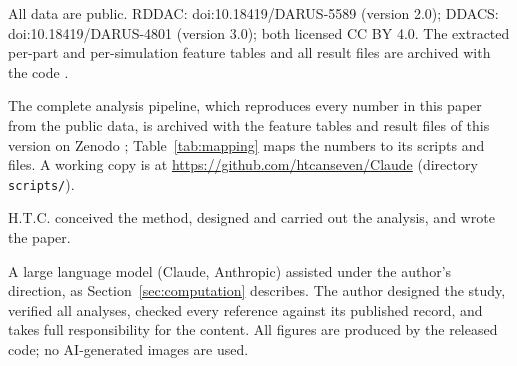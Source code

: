 \documentclass[pdflatex,sn-basic,lineno]{sn-jnl}
\begin{document}
All data are public. RDDAC: doi:10.18419/DARUS-5589 (version 2.0); DDACS: doi:10.18419/DARUS-4801 (version 3.0); both licensed CC BY 4.0. The extracted per-part and per-simulation feature tables and all result files are archived with the code \citep{canseven2026archive}.

The complete analysis pipeline, which reproduces every number in this paper from the public data, is archived with the feature tables and result files of this version on Zenodo \citep{canseven2026archive}; Table~\ref{tab:mapping} maps the numbers to its scripts and files. A working copy is at \url{https://github.com/htcanseven/Claude} (directory \texttt{scripts/}).

H.T.C. conceived the method, designed and carried out the analysis, and wrote the paper.

A large language model (Claude, Anthropic) assisted under the author's direction, as Section~\ref{sec:computation} describes. The author designed the study, verified all analyses, checked every reference against its published record, and takes full responsibility for the content. All figures are produced by the released code; no AI-generated images are used.


\FloatBarrier
{\small
}
\end{document}
